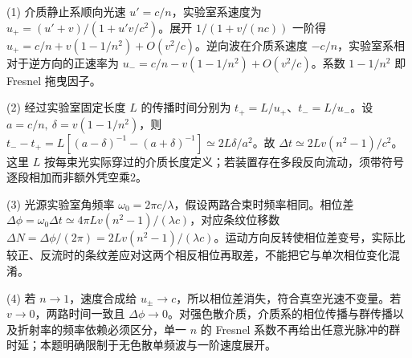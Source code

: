 (1) 介质静止系顺向光速 \(u'=c/n\)，实验室系速度为 \(u_+=(u'+v)/(1+u'v/c^2)\)。展开 \(1/(1+v/(nc))\) 一阶得 \(u_+=c/n+v(1-1/n^2)+O(v^2/c)\)。逆向波在介质系速度 \(-c/n\)，实验室系相对于逆方向的正速率为 \(u_-=c/n-v(1-1/n^2)+O(v^2/c)\)。系数 \(1-1/n^2\) 即 Fresnel 拖曳因子。

(2) 经过实验室固定长度 \(L\) 的传播时间分别为 \(t_+=L/u_+\)、\(t_-=L/u_-\)。设 \(a=c/n,\ \delta=v(1-1/n^2)\)，则 \(t_--t_+=L[(a-\delta)^{-1}-(a+\delta)^{-1}]\simeq2L\delta/a^2\)。故 \(\Delta t\simeq2Lv(n^2-1)/c^2\)。这里 \(L\) 按每束光实际穿过的介质长度定义；若装置存在多段反向流动，须带符号逐段相加而非额外凭空乘2。

(3) 光源实验室角频率 \(\omega_0=2\pi c/\lambda\)，假设两路合束时频率相同。相位差 \(\Delta\phi=\omega_0\Delta t\simeq4\pi Lv(n^2-1)/(\lambda c)\)，对应条纹位移数 \(\Delta N=\Delta\phi/(2\pi)=2Lv(n^2-1)/(\lambda c)\)。运动方向反转使相位差变号，实际比较正、反流时的条纹差应对这两个相反相位再取差，不能把它与单次相位变化混淆。

(4) 若 \(n\to1\)，速度合成给 \(u_\pm\to c\)，所以相位差消失，符合真空光速不变量。若 \(v\to0\)，两路时间一致且 \(\Delta\phi\to0\)。对强色散介质，介质系的相位传播与群传播以及折射率的频率依赖必须区分，单一 \(n\) 的 Fresnel 系数不再给出任意光脉冲的群时延；本题明确限制于无色散单频波与一阶速度展开。
